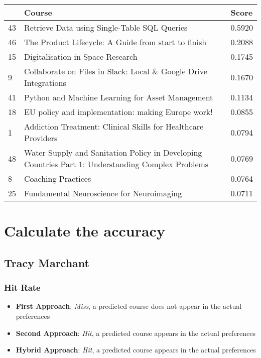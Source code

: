 \begin{table}[H]
\small
\begin{tabular}{|p{0.5cm}|p{10cm}|p{1.5cm}|}
\hline
& Course & Score \\
\hline
43 & Retrieve Data using Single-Table SQL Queries & 0.5920 \\
46 & The Product Lifecycle: A Guide from start to finish & 0.2088 \\
15 & Digitalisation in Space Research & 0.1745 \\
9 & Collaborate on Files in Slack: Local \& Google Drive Integrations & 0.1670 \\
41 & Python and Machine Learning for Asset Management & 0.1134 \\
18 & EU policy and implementation: making Europe work! & 0.0855 \\
1 & Addiction Treatment: Clinical Skills for Healthcare Providers & 0.0794 \\
48 & Water Supply and Sanitation Policy in Developing Countries Part 1: Understanding Complex Problems & 0.0769 \\
8 & Coaching Practices & 0.0764 \\
25 & Fundamental Neuroscience for Neuroimaging & 0.0711 \\
\hline
\end{tabular}
\end{table}

\section{Calculate the accuracy}

\subsection{Tracy Marchant}

\subsubsection{Hit Rate}

\begin{itemize}
    \item \textbf{First Approach}: \textit{Miss}, a predicted course does not appear in the actual preferences
    \item \textbf{Second Approach}: \textit{Hit}, a predicted course appears in the actual preferences
    \item \textbf{Hybrid Approach}: \textit{Hit}, a predicted course appears in the actual preferences
\end{itemize}

